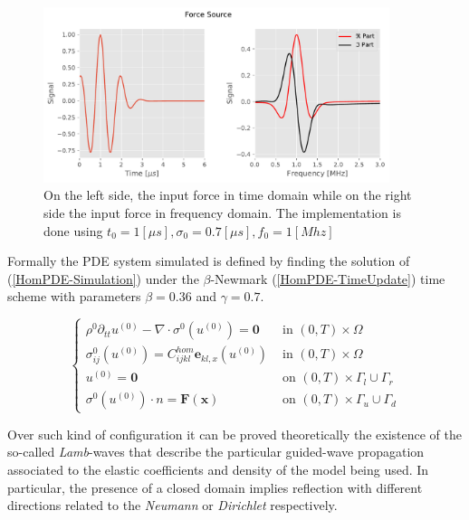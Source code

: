 \begin{figure}[!h]
	\centering
	\includegraphics[width=0.9\textwidth]{images/ImgExt/ForceSource.pdf}
	\caption{On the left side, the input force in time domain while on the right side the input force in frequency domain. The implementation is done using $t_0 = 1 [\mu s], \sigma_0 = 0.7 [\mu s], f_0 = 1 [Mhz]$}
	\label{ForceSource}
\end{figure}


Formally the PDE system simulated is defined
by finding the solution of (\ref{HomPDE-Simulation}) under the $\beta$-Newmark (\ref{HomPDE-TimeUpdate}) time scheme with parameters $\beta = 0.36$ and $\gamma = 0.7$.

\begin{equation}
    \label{HomPDE-Simulation}
    \left \{
    \begin{array}{cc}
        \rho^{0} \partial_{tt} u^{(0)} - \nabla \cdot \sigma^{0} (u^{(0)}) = \mathbf{0} & \text{ in } (0,T)\times \Omega \\
        \sigma^{0}_{ij}(u^{(0)}) = C^{hom}_{ijkl}\mathbf{e}_{kl,x}(u^{(0)}) & \text{ in } (0,T)\times \Omega \\
        u^{(0)} = \mathbf{0} & \text{ on } (0,T)\times \Gamma_l \cup \Gamma_r \\
        \sigma^{0}(u^{(0)}) \cdot n = \mathbf{F}(\mathbf{x}) & \text{ on } (0,T)\times \Gamma_u \cup \Gamma_d
    \end{array}
    \right .
\end{equation}

Over such kind of configuration it can be proved theoretically the existence of the so-called \textit{Lamb}-waves that describe the particular guided-wave propagation associated to the elastic coefficients and density of the model being used.
In particular, the presence of a closed domain implies reflection with different directions related to the \textit{Neumann} or \textit{Dirichlet} respectively.


